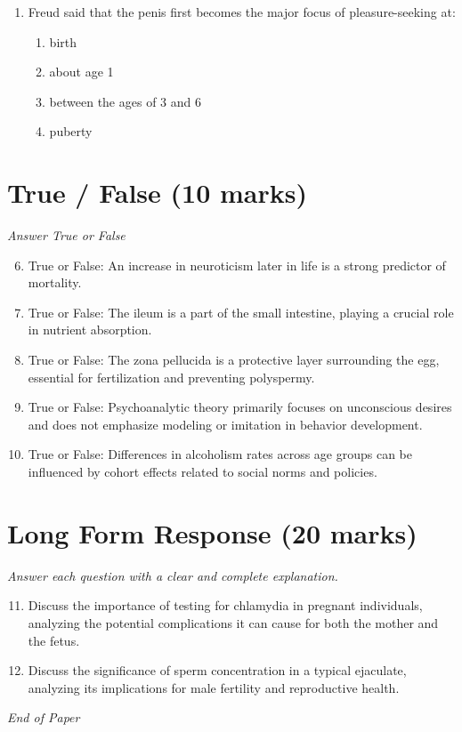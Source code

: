 \documentclass[12pt]{article}
\begin{document}
\begin{enumerate}[label=\arabic*.]
\begin{enumerate}[label=(\alph*)]
    \item it is an endangered species
    \item it is the closest to humans of any existing plant
    \item it is a small plant with a small genome size which can be raised inexpensively
\end{enumerate}
\item Freud said that the penis first becomes the major focus of pleasure-seeking at:
\begin{enumerate}[label=(\alph*)]
    \item birth
    \item about age 1
    \item between the ages of 3 and 6
    \item puberty
\end{enumerate}
\end{enumerate}

\section*{True / False (10 marks)}
\textit{Answer True or False}
\begin{enumerate}[label=\arabic*.]
\setcounter{enumi}{5}
\item True or False: An increase in neuroticism later in life is a strong predictor of mortality.
\item True or False: The ileum is a part of the small intestine, playing a crucial role in nutrient absorption.
\item True or False: The zona pellucida is a protective layer surrounding the egg, essential for fertilization and preventing polyspermy.
\item True or False: Psychoanalytic theory primarily focuses on unconscious desires and does not emphasize modeling or imitation in behavior development.
\item True or False: Differences in alcoholism rates across age groups can be influenced by cohort effects related to social norms and policies.
\end{enumerate}

\section*{Long Form Response (20 marks)}
\textit{Answer each question with a clear and complete explanation.}
\begin{enumerate}[label=\arabic*.]
\setcounter{enumi}{10}
\item Discuss the importance of testing for chlamydia in pregnant individuals, analyzing the potential complications it can cause for both the mother and the fetus.
\item Discuss the significance of sperm concentration in a typical ejaculate, analyzing its implications for male fertility and reproductive health.
\end{enumerate}

\vfill
\noindent\textit{End of Paper}
\end{document}
